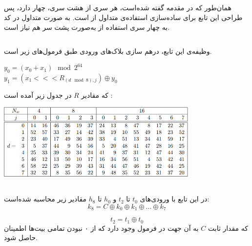 \subsection{}
\label{subsec:TFBIG-MIX8}


همان‌طور که در مقدمه گفته‌ شده‌است،‌ هر سری از هشت سری، چهار  دارد، پس طراحی این تابع برای ساده‌سازی استفاده‌ی متداول از \hyperref[subsec:TFBIG-MIX]{} ‌است. به صورت متداول در کد به چهار سری استفاده از   به‌صورت پشت‌ سر هم نیاز است.


\subsection{}
\label{subsec:TFBIG-MIX}

وظیفه‌ی این تابع، درهم سازی بلاک‌های ورودی طبق فرمول‌های زیر است.
\begin{center}
	$y_0 = (x_0 + x_1) \mod 2^{64}$ \\
	$ y_1 = (x_1 <<< R_{(d \mod 8), j}) \oplus y_0$
\end{center}
که مقادیر $ R $ در جدول زیر آمده است :

\begin{center}
	\includegraphics[width=10cm]{images/GoldenModelDocumentation/MIX1.png}
\end{center}




\subsection{}
\label{subsec:TFBIG-KINIT}
در این تابع با ورودی‌های $ t_0 $ تا $ t_2 $ و $h_0 $ تا $ h_8 $ مقادیر زیر محاسبه شده‌است:
$$
k_8 = C \oplus k_0 \oplus k_1 \oplus ... \oplus k_7
$$

$$
t_2 = t_1 \oplus t_0
$$
که مقدار ثابت $ C $ به آن جهت در فرمول وجود دارد که از ۰ نبودن تمامی بیت‌ها اطمینان حاصل شود.

\subsection{}
\label{subsec:DECL-STATE-BIG}


